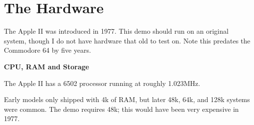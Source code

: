 \documentclass[twocolumn]{article}
\begin{document}





%

\section{The Hardware}

	The Apple II was introduced in 1977.
	This demo should run on an original system, though I do not
	have hardware that old to test on.
	Note this predates the Commodore 64 by five years.

	{\bf CPU, RAM and Storage}

	The Apple II has a 6502 processor running at roughly 1.023MHz.

	Early models only shipped with 4k of RAM, but later 48k, 64k, and 128k
	systems were common.
	The demo requires 48k; this would have been very expensive in 1977.
\end{document}
